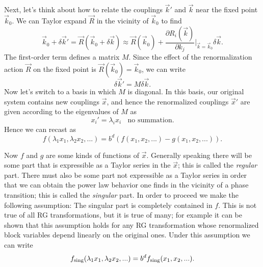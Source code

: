 Next, let's think about how to relate the couplings $\vec{k}'$ and $\vec{k}$
near the fixed point $\vec{k}_0$. 
We can Taylor expand $\vec{R}$ in the vicinity of $\vec{k}_0$ to find
\begin{equation}
  \vec{k}_0+\delta\vec{k}'=\vec{R}\left(\vec{k}_0+\delta\vec{k}\right)
                          \approx\vec{R}(\vec{k}_0)
                           +\frac{\partial R_i(\vec{k})}{\partial k_j}
                              \Big|_{\vec{k}=\vec{k}_0}\delta\vec{k}.
\end{equation}
The first-order term defines a matrix $M$.
Since the effect of the renormalization action
$\vec{R}$ on the fixed point is $\vec{R}(\vec{k}_0)=\vec{k}_0$, we can write
\begin{equation}
  \delta\vec{k}'=M\delta\vec{k}.
\end{equation}
Now let's switch to a basis in which $M$ is diagonal. In this basis, our
original system contains new couplings $\vec{x}$, and hence the renormalized
couplings $\vec{x}'$ are given according to the eigenvalues of $M$ as
\begin{equation}
  x_i'=\lambda_i x_i~~~~\text{no summation}.
\end{equation}
Hence we can recast  as
\begin{equation}\label{eq:widom1}
f(\lambda_1x_1,\lambda_2x_2,...)=b^d\left(f(x_1,x_2,...)-g(x_1,x_2,...)\right).
\end{equation}


Now $f$ and $g$ are some kinds of functions of $\vec{x}$. Generally speaking
there will be some part that is expressible as a Taylor series in the $\vec{x}$;
this is called the {\it regular} part. There must also be some
part not expressible as a Taylor series in order that we can obtain the power
law behavior one finds in the vicinity of a phase transition; this is
called the {\it singular} part. In order to proceed we make
the following assumption: The singular part is completely contained in
$f$. This is not true of all RG transformations, but it is true
of many; for example it can be shown that this assumption holds for any
RG transformation whose renormalized block variables depend linearly
on the original ones. Under this assumption we can write
\begin{equation}\label{eq:widom2}
  f_{\text{sing}}(\lambda_1x_1,\lambda_2x_2,...)=b^df_{\text{sing}}(x_1,x_2,...).
\end{equation}


